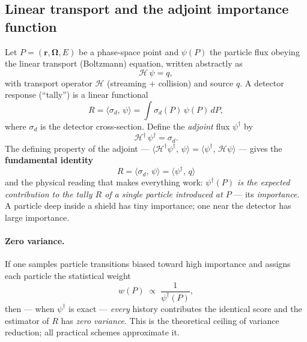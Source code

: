 \documentclass[11pt]{article}
\newcommand{\dg}{^{\dagger}}
\newcommand{\ip}[2]{\langle #1,\,#2\rangle}
\begin{document}
\subsection{Linear transport and the adjoint importance function}
Let $P=(\mathbf r,\mathbf\Omega,E)$ be a phase-space point and $\psi(P)$ the particle flux
obeying the linear transport (Boltzmann) equation, written abstractly as
\begin{equation}
\mathcal H\,\psi = q ,
\end{equation}
with transport operator $\mathcal H$ (streaming $+$ collision) and source $q$. A detector
response (``tally'') is a linear functional
\begin{equation}
R=\ip{\sigma_d}{\psi}=\int \sigma_d(P)\,\psi(P)\,dP ,
\end{equation}
where $\sigma_d$ is the detector cross-section. Define the \emph{adjoint} flux $\psi\dg$ by
\begin{equation}
\mathcal H\dg\,\psi\dg=\sigma_d .
\label{eq:adjoint}
\end{equation}
The defining property of the adjoint --- $\ip{\mathcal H\dg\psi\dg}{\psi}=\ip{\psi\dg}{\mathcal H\psi}$ --- gives the
\textbf{fundamental identity}
\begin{equation}
\boxed{\;R=\ip{\sigma_d}{\psi}=\ip{\psi\dg}{q}\;}
\label{eq:fund}
\end{equation}
and the physical reading that makes everything work: \emph{$\psi\dg(P)$ is the expected
contribution to the tally $R$ of a single particle introduced at $P$} --- its
\emph{importance}. A particle deep inside a shield has tiny importance; one near the
detector has large importance.

\paragraph{Zero variance.} If one samples particle transitions biased toward high
importance and assigns each particle the statistical weight
\begin{equation}
w(P)\;\propto\;\frac{1}{\psi\dg(P)},
\label{eq:wtarget}
\end{equation}
then --- when $\psi\dg$ is exact --- \emph{every} history contributes the identical score
and the estimator of $R$ has \emph{zero variance}. This is the theoretical ceiling of
variance reduction; all practical schemes approximate it.
\end{document}
